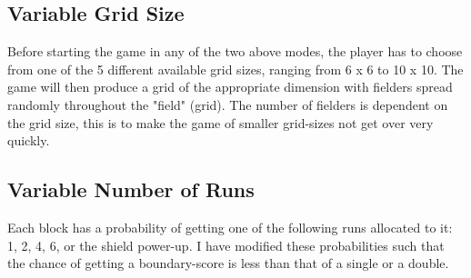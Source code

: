 \documentclass{article}
\begin{document}
\subsection{Variable Grid Size}
Before starting the game in any of the two above modes, the player has to choose from one of the 5 different available grid sizes, ranging from 6 x 6 to 10 x 10. The game will then produce a grid of the appropriate dimension with fielders spread randomly throughout the "field" (grid). The number of fielders is dependent on the grid size, this is to make the game of smaller grid-sizes not get over very quickly.
\subsection{Variable Number of Runs}
Each block has a probability of getting one of the following runs allocated to it: 1, 2, 4, 6, or the shield power-up. I have modified these probabilities such that the chance of getting a boundary-score is less than that of a single or a double.
\end{document}
